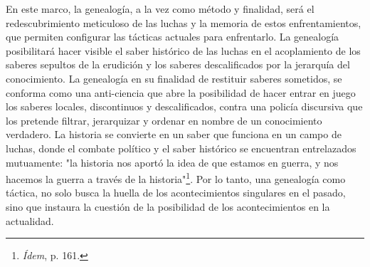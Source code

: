 En este marco, la genealogía, a la vez como método y finalidad, será el
redescubrimiento meticuloso de las luchas y la memoria de estos
enfrentamientos, que permiten configurar las tácticas actuales para
enfrentarlo. La genealogía posibilitará hacer visible el saber histórico
de las luchas en el acoplamiento de los saberes sepultos de la erudi­ción
y los saberes descalificados por la jerarquía del cono­cimiento. La
genealogía en su finalidad de restituir saberes sometidos, se conforma
como una anti-ciencia que abre la posibilidad de hacer entrar en juego
los saberes locales, discontinuos y descalificados, contra una policía
discursiva que los pretende filtrar, jerarquizar y ordenar en nombre de
un conocimiento verdadero. La historia se convierte en un saber que
funciona en un campo de luchas, donde el combate político y el saber
histórico se encuentran entrelazados mutuamente: "la historia nos aportó
la idea de que estamos en guerra, y nos hacemos la guerra a través de la
historia"\footnote{\emph{Ídem}, p. 161.}. Por lo tanto, una genealogía
como táctica, no solo busca la huella de los acontecimientos singulares
en el pasado, sino que instaura la cuestión de la posibilidad de los
acontecimientos en la actualidad.

